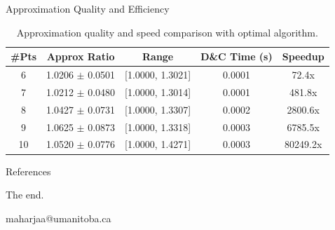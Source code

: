 \documentclass[11pt]{beamer}
\makeatletter
\newcommand{\email}{maharjaa@umanitoba.ca}
\makeatother
\begin{document}
\begin{frame}{Approximation Quality and Efficiency}
	\scriptsize
	\begin{table}[htbp]
		\centering
		\begin{tabular}{|c|c|c|c|c|}
			\hline
			\textbf{\#Pts} & \textbf{Approx Ratio} & \textbf{Range}   & \textbf{D\&C Time (s)} & \textbf{Speedup} \\
			\hline
			6              & 1.0206 $\pm$ 0.0501   & [1.0000, 1.3021] & 0.0001                 & 72.4x            \\
			7              & 1.0212 $\pm$ 0.0480   & [1.0000, 1.3014] & 0.0001                 & 481.8x           \\
			8              & 1.0427 $\pm$ 0.0731   & [1.0000, 1.3307] & 0.0002                 & 2800.6x          \\
			9              & 1.0625 $\pm$ 0.0873   & [1.0000, 1.3318] & 0.0003                 & 6785.5x          \\
			10             & 1.0520 $\pm$ 0.0776   & [1.0000, 1.4271] & 0.0003                 & 80249.2x         \\
			\hline
		\end{tabular}
		\caption{Approximation quality and speed comparison with optimal algorithm.}
	\end{table}
\end{frame}

\begin{frame}[allowframebreaks]{References}
	
\end{frame}

\begin{frame}
	\begin{center}
		The end.

		\email
	\end{center}
\end{frame}
\end{document}
